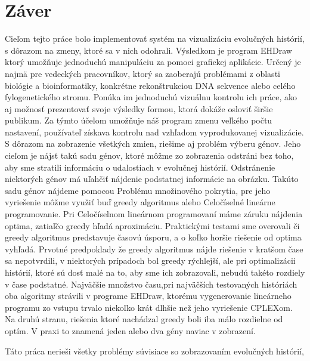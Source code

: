 \chapter*{Záver}

Cieľom tejto práce bolo implementovať systém na vizualizáciu evolučných histórií, s dôrazom na zmeny, ktoré sa v nich odohrali.
Výsledkom je program EHDraw ktorý umožňuje jednoduchú manipuláciu za pomoci grafickej aplikácie.
Určený je najmä pre vedeckých pracovníkov, ktorý sa zaoberajú problémami z oblasti biológie a bioinformatiky,
konkrétne rekonštrukciou DNA sekvence alebo celého fylogenetického stromu. 
Ponúka im jednoduchú vizuálnu kontrolu ich práce, ako aj možnosť prezentovať svoje výsledky formou, ktorá dokáže osloviť širšie publikum.
Za týmto účelom umožňuje náš program zmenu veľkého počtu nastavení, používateľ získava kontrolu nad vzhľadom vyprodukovanej vizualizácie.
S dôrazom na zobrazenie všetkých zmien, riešime aj problém výberu génov. Jeho cieľom je nájsť takú sadu génov,
ktoré môžme zo zobrazenia odstráni bez toho, aby sme stratili informáciu o udalostiach v evolučnej histórií.
Odstránenie niektorých génov má uľahčiť nájdenie podstatnej informácie na obrázku.
Takúto sadu génov nájdeme pomocou Problému množinového pokrytia, 
pre jeho vyriešenie môžme využiť buď greedy algoritmus alebo Celočíselné lineárne programovanie.
Pri Celočíselnom lineárnom programovaní máme záruku nájdenia optima, zatiaľčo greedy hľadá aproximáciu.
Praktickými testami sme overovali či greedy algoritmus predstavuje časovú úsporu, a o koľko horšie riešenie od optima vyhľadá.
Prvotné predpoklady že greedy algoritmus nájde riešenie v kratšom čase sa nepotvrdili, v niektorých prípadoch bol greedy rýchlejší,
ale pri optimalizácii histórií, ktoré sú dosť malé na to, aby sme ich zobrazovali, nebudú takéto rozdiely v čase podstatné.
Najväčšie množstvo času,pri najväčších testovaných históriách oba algoritmy strávili v programe EHDraw, ktorému vygenerovanie lineárneho programu 
zo vstupu trvalo niekoľko krát dlhšie než jeho vyriešenie CPLEXom.
Na druhú stranu, riešenia ktoré nachádzal greedy boli iba málo rozdielne od optím. V praxi to znamená jeden alebo dva gény naviac v zobrazení.

Táto práca nerieši všetky problémy súvisiace so zobrazovaním evolučných histórií, 